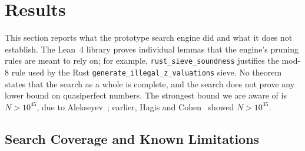 \section{Results}
\label{sec:results}

This section reports what the prototype search engine did and what
it does not establish.  The Lean~4 library proves individual lemmas
that the engine's pruning rules are meant to rely on; for example,
\texttt{rust\_\allowbreak{}sieve\_\allowbreak{}soundness} justifies the
mod-8 rule used by the Rust
\texttt{generate\_\allowbreak{}illegal\_\allowbreak{}z\_\allowbreak{}valuations}
sieve.  No theorem states that the search as a whole is complete, and
the search does not prove any lower bound on quasiperfect numbers.  The
strongest bound we are aware of is $N > 10^{45}$, due to
Alekseyev~\cite{alekseyev2026}; earlier, Hagis and
Cohen~\cite{hagis1982} showed $N > 10^{35}$.


\subsection{Search Coverage and Known Limitations}
\label{subsec:bounds_achieved}

